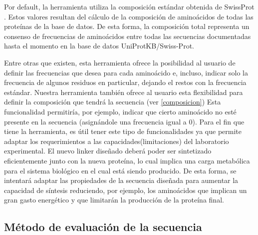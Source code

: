 Por default, la herramienta utiliza la composición estándar obtenida de SwissProt \cite{compositionAA}.  
Estos valores resultan del cálculo de la composición de aminoácidos de todas las proteínas de la base de datos. 
De esta forma, la composición total representa un consenso de frecuencias de aminoácidos entre todas las secuencias documentadas hasta el momento en la base de datos UniProtKB/Swiss-Prot.

Entre otras que existen, esta herramienta ofrece la posibilidad al usuario de definir las frecuencias que desea para cada aminoácido e, incluso,
indicar solo la frecuencia de algunos residuos en particular, dejando el restos con la frecuencia estándar. 
Nuestra herramienta también ofrece al usuario esta flexibilidad para definir la composición que tendrá la secuencia (ver \ref{composicion})
Esta funcionalidad permitiría, por ejemplo, indicar que cierto aminoácido no esté presente en la secuencia (asignándole una frecuencia igual a 0). 
Para el fin que tiene la herramienta, es útil tener este tipo de funcionalidades ya que permite adaptar los requerimientos a las capacidades(limitaciones) del laboratorio experimental. 
El nuevo linker diseñado deberá poder ser sintetizado eficientemente junto con la nueva proteína, lo cual implica una carga metabólica para el sistema biológico en el cual está siendo producido. 
De esta forma, se intentará adaptar las propiedades de la secuencia diseñada para aumentar la capacidad de síntesis reduciendo, por ejemplo, los aminoácidos que implican un gran gasto energético y que limitarán la producción de la proteína final.




\subsection{Método de evaluación de la secuencia}



